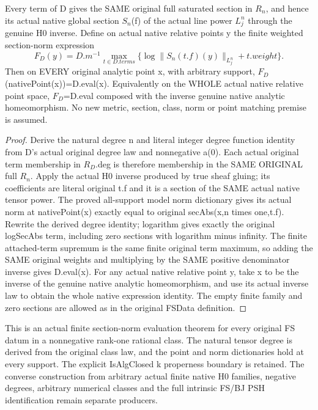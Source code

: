 \begin{theorem}
\label{thm:seven-native-original-finite-fs-model-norms}
\leanok
Every term of D gives the SAME original full saturated section in $R_n$,
and hence its actual native global section $S_n$(f) of the actual line
power $L_j^n$ through the genuine H0 inverse. Define on actual native
relative points y the finite weighted section-norm expression
\[
 F_D(y)=D.m^{-1}\max_{t\in D.terms}
  \{\log\|S_n(t.f)(y)\|_{L_j^n}+t.weight\}.
\]
Then on EVERY original analytic point x, with arbitrary support,
$F_D$(nativePoint(x))=D.eval(x). Equivalently on the WHOLE actual native
relative point space,
$F_D$=D.eval composed with the inverse genuine native analytic homeomorphism.
No new metric, section, class, norm or point matching premise is assumed.
\end{theorem}
\begin{proof}
Derive the natural degree n and literal integer degree function identity
from D's actual original degree law and nonnegative a(0). Each actual
original term membership in $R_D$.deg is therefore membership in the SAME
ORIGINAL full $R_n$. Apply the actual H0 inverse produced by true sheaf
gluing; its coefficients are literal original t.f and it is a section of
the SAME actual native tensor power. The proved all-support model norm
dictionary gives its actual norm at nativePoint(x) exactly equal to
original secAbs(x,n times one,t.f). Rewrite the derived degree identity;
logarithm gives exactly the original logSecAbs term, including zero
sections with logarithm minus infinity. The finite attached-term supremum
is the same finite original term maximum, so adding the SAME original
weights and multiplying by the SAME positive denominator inverse gives
D.eval(x). For any actual native relative point y, take x to be the inverse
of the genuine native analytic homeomorphism, and use its actual inverse
law to obtain the whole native expression identity. The empty finite
family and zero sections are allowed as in the original FSData definition.
\end{proof}


\begin{remark}
This is an actual finite section-norm evaluation theorem for every original
FS datum in a nonnegative rank-one rational class. The natural tensor degree
is derived from the original class law, and the point and norm dictionaries
hold at every support. The explicit IsAlgClosed k properness boundary is
retained. The converse construction from arbitrary actual finite native H0
families, negative degrees, arbitrary numerical classes and the full
intrinsic FS/BJ PSH identification remain separate producers.
\end{remark}


